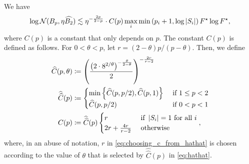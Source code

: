 \documentclass[11pt]{article}
\numberwithin{equation}{section}
\begin{document}
\begin{lemma}
\label{lemma:covering_two_to_one}
We have
\begin{align*}
    \log\mathcal{N}(B_p,\eta \widehat{B_2}) \lesssim \eta^{-\frac{2p}{2-p}} \cdot C(p)\max_{i}\min\left(p_i+1,\log\left\lvert S_i \right\rvert\right)F^{\star}\log F^{\star},
\end{align*}
where $C(p)$ is a constant that only depends on $p$. The constant $C(p)$ is defined as follows. For $0 < \theta < p$, let $r=(2-\theta)p/(p-\theta)$. Then, we define
\begin{align}
    \widehat{C}(p,\theta) &\coloneqq \left(\frac{\left(2\cdot 8^{2/\theta}\right)^{-\frac{\theta}{2-\theta}}}{2}\right)^{-\frac{2r}{r-2}}\nonumber \\
    \widehat{\widehat{C}}(p) &\coloneqq \begin{cases} \min\left\{\widehat{C}(p,p/2), \widehat{C}(p,1)\right\} & \text{ if } 1 \le p < 2 \\ \widehat{C}(p,p/2) & \text{ if } 0 < p < 1 \end{cases}\label{eq:hathat} \\
    C(p) &\coloneqq \widehat{\widehat{C}}(p)\begin{cases} r & \text{ if } \left\lvert S_i \right\rvert = 1 \text{ for all } i \\ 2r + \frac{4r}{r-2} & \text{ otherwise} \end{cases}\label{eq:choosing_c_from_hathat},
\end{align}
where, in an abuse of notation, $r$ in \eqref{eq:choosing_c_from_hathat} is chosen according to the value of $\theta$ that is selected by $\widehat{\widehat{C}}(p)$ in \eqref{eq:hathat}.
\end{lemma}
\end{document}
